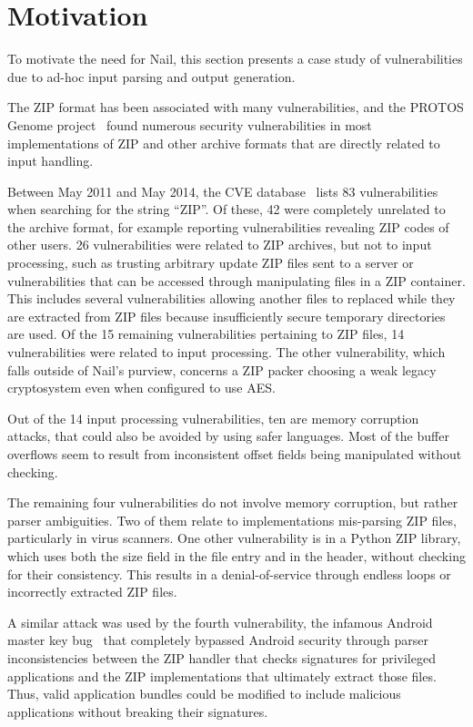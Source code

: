 \section{Motivation}
\label{s:motivation}

To motivate the need for Nail, this section presents a case study of
vulnerabilities due to ad-hoc input parsing and output generation.

The ZIP format has been associated with many vulnerabilities, and the
PROTOS Genome project~\cite{protoc-c10-archive} found numerous security vulnerabilities in most
implementations of ZIP and other archive formats that are directly
related to input handling.

Between May 2011 and May 2014, the CVE database~\cite{cve-database} lists
83 vulnerabilities when searching for the string ``ZIP''. Of these, 42
were completely unrelated to the archive format, for example reporting
vulnerabilities revealing ZIP codes of other users. 26 vulnerabilities
were related to ZIP archives, but not to input processing, such as
trusting arbitrary update ZIP files sent to a server or vulnerabilities
that can be accessed through manipulating files in a ZIP container. This
includes several vulnerabilities allowing another files to replaced while
they are extracted from ZIP files because insufficiently secure temporary
directories are used. Of the 15 remaining vulnerabilities pertaining
to ZIP files, 14 vulnerabilities were related to input processing. The
other vulnerability, which falls outside of Nail's purview, concerns a
ZIP packer choosing a weak legacy cryptosystem even when configured to
use AES.

Out of the 14 input processing vulnerabilities, ten are memory corruption
attacks, that could also be avoided by using safer languages.  Most of
the buffer overflows seem to result from inconsistent offset fields
being manipulated without checking.

The remaining four vulnerabilities do not involve memory corruption,
but rather parser ambiguities.  Two of them relate to implementations
mis-parsing ZIP files, particularly in virus scanners.  One other
vulnerability is in a Python ZIP library, which uses both the size
field in the file entry and in the header, without checking for their
consistency.  This results in a denial-of-service through endless loops
or incorrectly extracted ZIP files.

A similar attack was used by the fourth vulnerability, the infamous
Android master key bug~\cite{saurik-masterkey} that completely
bypassed Android security through parser inconsistencies between the
ZIP handler that checks signatures for privileged applications and the
ZIP implementations that ultimately extract those files. Thus, valid
application bundles could be modified to include malicious applications
without breaking their signatures.



